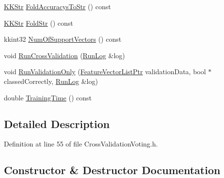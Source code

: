 \begin{DoxyCompactItemize}
\hyperlink{class_k_k_b_1_1_k_k_str}{K\+K\+Str} \hyperlink{class_k_k_m_l_l_1_1_cross_validation_voting_a306e9659d3304d8ed2f516008bc76254}{Fold\+Accuracys\+To\+Str} () const 
\item 
\hyperlink{class_k_k_b_1_1_k_k_str}{K\+K\+Str} \hyperlink{class_k_k_m_l_l_1_1_cross_validation_voting_ad9e9274de2caf022d13cf34823460b56}{Fold\+Str} () const 
\item 
kkint32 \hyperlink{class_k_k_m_l_l_1_1_cross_validation_voting_a06f59bb683a50a89ef502bf0290bdadc}{Num\+Of\+Support\+Vectors} () const 
\item 
void \hyperlink{class_k_k_m_l_l_1_1_cross_validation_voting_aa9f37c9e613600a118642bbc971126b0}{Run\+Cross\+Validation} (\hyperlink{class_k_k_b_1_1_run_log}{Run\+Log} \&log)
\item 
void \hyperlink{class_k_k_m_l_l_1_1_cross_validation_voting_a3f906c4d42415b2dbffc9d0722c760af}{Run\+Validation\+Only} (\hyperlink{namespace_k_k_m_l_l_acf2ba92a3cf03e2b19674b24ff488ef6}{Feature\+Vector\+List\+Ptr} validation\+Data, bool $\ast$classed\+Correctly, \hyperlink{class_k_k_b_1_1_run_log}{Run\+Log} \&log)
\item 
double \hyperlink{class_k_k_m_l_l_1_1_cross_validation_voting_a8cea2adb926da698249f28db875402b4}{Training\+Time} () const 
\end{DoxyCompactItemize}


\subsection{Detailed Description}


Definition at line 55 of file Cross\+Validation\+Voting.\+h.



\subsection{Constructor \& Destructor Documentation}
